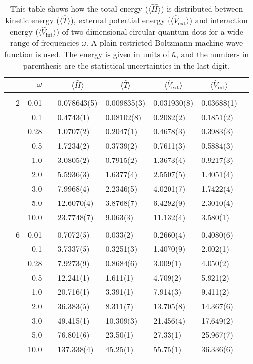 \begin{table}[H]
	\caption{This table shows how the total energy ($\langle\hat{H}\rangle$) is distributed between kinetic energy ($\langle\hat{T}\rangle$), external potential energy ($\langle\hat{V}_{\text{ext}}\rangle$) and interaction energy ($\langle\hat{V}_{\text{int}}\rangle$) of two-dimensional circular quantum dots for a wide range of frequencies $\omega$. A plain restricted Boltzmann machine wave function is used. The energy is given in units of $\hbar$, and the numbers in parenthesis are the statistical uncertainties in the last digit.}
	\label{tab:splitfrequencyQDRBM}
	\begin{tabularx}{\textwidth}{R{1cm}rrcR{2.3cm}R{2.3cm}R{2.3cm}R{2.3cm}R{1cm}} \hline\hline
		&\makecell{\\ \phantom{$N$} \\ \phantom{=}} & $\omega$ &&  &  &  &  & \\ \hline \\
		&2 & 0.01 && 0.078643(5) & 0.009835(3) & 0.031930(8) & 0.03688(1) \\
		&& 0.1 && 0.4743(1) & 0.08102(8) & 0.2082(2) & 0.1851(2) \\
		&& 0.28 && 1.0707(2) & 0.2047(1) & 0.4678(3) & 0.3983(3) \\
		&& 0.5 && 1.7234(2) & 0.3739(2) & 0.7611(3) & 0.5884(3)\\
		&& 1.0 && 3.0805(2) & 0.7915(2) & 1.3673(4) & 0.9217(3)\\
		&& 2.0 && 5.5936(3) & 1.6377(4) & 2.5507(5) & 1.4051(4) \\
		&& 3.0 && 7.9968(4) & 2.2346(5) & 4.0201(7) & 1.7422(4) \\ 
		&& 5.0 && 12.6070(4) & 3.8768(7) & 6.4292(9) & 2.3010(4) \\
		&& 10.0 && 23.7748(7) & 9.063(3) & 11.132(4) & 3.580(1) \\
		\hdashline \\
		
		&6 & 0.01 && 0.7072(5) & 0.033(2) & 0.2660(4) & 0.4080(6) \\
		&& 0.1 && 3.7337(5) & 0.3251(3) & 1.4070(9) & 2.002(1) \\
		&& 0.28 && 7.9273(9) & 0.8684(6) & 3.009(1) & 4.050(2) \\
		&& 0.5 && 12.241(1) & 1.611(1) & 4.709(2) & 5.921(2)\\
		&& 1.0 && 20.716(1) & 3.391(1) & 7.914(3) & 9.411(2)\\
		&& 2.0 && 36.383(5) & 8.311(7) & 13.705(8) & 14.367(6) \\
		&& 3.0 && 49.415(1) & 10.309(3) & 21.456(4) & 17.649(2) \\ 
		&& 5.0 && 76.801(6) & 23.50(1) & 27.33(1) & 25.967(7) \\
		&& 10.0 && 137.338(4) & 45.25(1) & 55.75(1) & 36.336(6) \\
		\hdashline \\
		

\end{tabularx}
\end{table}

